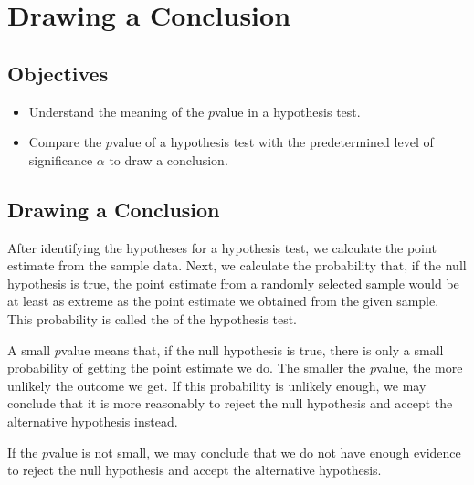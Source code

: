 \documentclass[letterpaper,10pt,english]{jupyterBook}
\begin{document}
\sphinxstepscope


\section{Drawing a Conclusion}
\label{\detokenize{Ch6 An Introduction to Hypothesis Testing/6.3 Drawing a Conclusion:drawing-a-conclusion}}\label{\detokenize{Ch6 An Introduction to Hypothesis Testing/6.3 Drawing a Conclusion::doc}}

\subsection{Objectives}
\label{\detokenize{Ch6 An Introduction to Hypothesis Testing/6.3 Drawing a Conclusion:objectives}}\begin{itemize}
\item {} 
\sphinxAtStartPar
Understand the meaning of the \(p\)\sphinxhyphen{}value in a hypothesis test.

\item {} 
\sphinxAtStartPar
Compare the \(p\)\sphinxhyphen{}value of a hypothesis test with the predetermined level of significance \(\alpha\) to draw a conclusion.

\end{itemize}


\subsection{Drawing a Conclusion}
\label{\detokenize{Ch6 An Introduction to Hypothesis Testing/6.3 Drawing a Conclusion:id1}}
\sphinxAtStartPar
After identifying the hypotheses for a hypothesis test, we calculate the point estimate from the sample data. Next, we calculate the probability that, if the null hypothesis is true, the point estimate from a randomly selected sample would be at least as extreme as the point estimate we obtained from the given sample. This probability is called the  of the hypothesis test.

\sphinxAtStartPar
A small \(p\)\sphinxhyphen{}value means that, if the null hypothesis is true, there is only a small probability of getting the point estimate we do. The smaller the \(p\)\sphinxhyphen{}value, the more unlikely the outcome we get. If this probability is unlikely enough, we may conclude that it is more reasonably to reject the null hypothesis and accept the alternative hypothesis instead.

\sphinxAtStartPar
If the \(p\)\sphinxhyphen{}value is not small, we may conclude that we do not have enough evidence to reject the null hypothesis and accept the alternative hypothesis.
\end{document}

